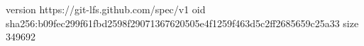 version https://git-lfs.github.com/spec/v1
oid sha256:b09fec299f61fbd2598f29071367620505e4f1259f463d5c2ff2685659c25a33
size 349692
